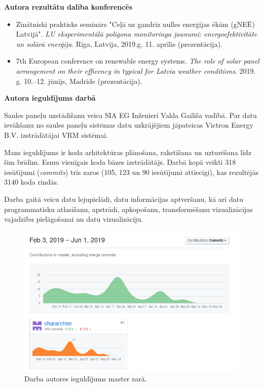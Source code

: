 \textbf{Autora rezultātu dalība konferencēs}
\begin{itemize}
\item Zinātniski praktisks seminārs "Ceļā uz gandrīz nulles enerģijas ēkām (gNEĒ) Latvijā". \emph{LU eksperimentālā poligona monitoringa jaunumi: energoefektivitāte un solārā enerģija}. Rīga, Latvija, 2019.g. 11. aprīlis (prezentācija).
\item 7th European conference on renewable energy systems. \emph{The role of solar panel arrangement on their efficency in typical for Latvia weather conditions}. 2019. g. 10.--12. jūnijs, Madride (prezentācija).
\end{itemize}

\textbf{Autora ieguldījums darbā}

Saules paneļu uzstādīšanu veica SIA EG Inženieri Valda Gailīša vadībā.
Par datu ievākšanu no saules paneļu sistēmas datu uzkrājējiem jāpateicas Victron Energy B.V. izstrādātājai VRM sistēmai.

Mans ieguldījums ir koda arhitektūras plānošana, rakstīšana un uzturēšana līdz šim brīdim. Esmu vienīgais koda bāzes izstrādātājs. Darbā kopā veikti 318 iesūtījumi (\textit{commits}) trīs zaros (105, 123 un 90 iesūtījumi attiecīgi), kas rezultējās 3140 koda rindās. 

Darba gaitā veicu datu lejupielādi, datu informācijas aptveršanu, kā arī datu programmatisku atlasīšanu, apstrādi, apkopošanu, transformēšanu vizualizācijas vajadzību pielāgošanai un datu vizualizāciju. 

\begin{figure}[h]
	\centering
	\includegraphics[width=0.6\linewidth]{figures/misc/contributions.png}
	\caption{Darba autores ieguldījums master zarā.}
	\label{fig:retribution}
\end{figure}

